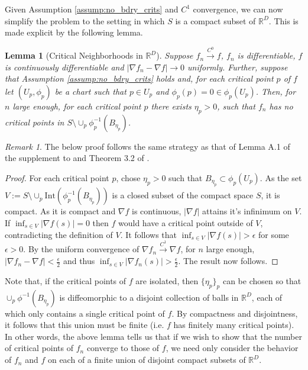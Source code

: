 \documentclass[11pt]{article}
\newcommand{\1}{\mathbf{1}}
\newtheorem{lemma}{Lemma}%
\theoremstyle{definition}
\theoremstyle{remark}
\newtheorem*{remark}{Remark}
\begin{document}
Given Assumption \ref{assump:no_bdry_crits} and $C^1$ convergence, we can now simplify the problem to the setting in which $S$ is a compact subset of $\mathbb{R}^D$. This is made explicit by the following lemma.
\begin{mdframed}
\begin{lemma}[Critical Neighborhoods in $\mathbb{R}^D$]\label{lemma:mfld_to_R}
    Suppose $f_n\xrightarrow{C^0}f$, $f_n$ is differentiable, $f$ is continuously differentiable and $|\nabla f_n-\nabla f|\rightarrow 0$ uniformly. Further, suppose that Assumption \ref{assump:no_bdry_crits} holds and, for each critical point $p$ of $f$ let $(U_p, \phi_p)$ be a chart such that $p\in U_p$ and $\phi_p(p)=0\in \phi_p(U_p)$. Then, for $n$ large enough, for each critical point $p$ there exists $\eta_p>0$, such that $f_n$ has no critical points in $S\setminus \cup_p \phi_p^{-1}(B_{\eta_p})$.
    \vspace{0.2cm}
\end{lemma}
\end{mdframed}
\begin{remark}
    The below proof follows the same strategy as that of Lemma A.1 of the supplement to \cite{Cheng2017} and Theorem 3.2 of \cite{davenport2022confidenceregionslocationpeaks}. 
\end{remark}
\begin{proof}
    For each critical point $p$, chose $\eta_p>0$ such that $B_{\eta_p}\subset \phi_p(U_p)$. As the set $V:=S\setminus \cup_p \text{Int}(\phi_p^{-1}(B_{\eta_p}))$ is a closed subset of the compact space $S$, it is compact. As it is compact and $\nabla f$ is continuous, $|\nabla f|$ attains it's infinimum on $V$. If $\inf_{s \in V}|\nabla f(s)|=0$ then $f$ would have a critical point outside of $V$, contradicting the definition of $V$. It follows that $\inf_{s \in V}|\nabla f(s)|> \epsilon$ for some $\epsilon > 0$. By the uniform convergence of $\nabla f_n\xrightarrow{C^1} \nabla f$, for $n$ large enough, $|\nabla f_n-\nabla f|<\frac{\epsilon}{2}$ and thus $\inf_{s \in V}|\nabla f_n(s)|> \frac{\epsilon}{2}$. The result now follows.
\end{proof}
    Note that, if the critical points of $f$ are isolated, then $\{\eta_p\}_p$ can be chosen so that $\cup_p\phi^{-1}(B_{\eta_p})$ is diffeomorphic to a disjoint collection of balls in $\mathbb{R}^D$, each of which only contains a single critical point of $f$. By compactness and disjointness, it follows that this union must be finite (i.e. $f$ has finitely many critical points). In other words, the above lemma tells us that if we wish to show that the number of critical points of $f_n$ converge to those of $f$, we need only consider the behavior of $f_n$ and $f$ on each of a finite union of disjoint compact subsets of $\mathbb{R}^D$.
    
\end{document}
